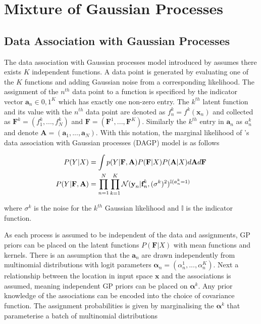 \documentclass[12pt,a4paper]{report}
\theoremstyle{definition}
\begin{document}
\section{Mixture of Gaussian Processes}

\subsection{Data Association with Gaussian Processes}

The data association with Gaussian processes model introduced by \citet{Kaiser2020} assumes there exists $K$ independent functions.
A data point is generated by evaluating one of the $K$ functions and adding Gaussian noise from a corresponding likelihood.
The assignment of the $n^{th}$ data point to a function is specificed by the indicator vector $\textbf{a}_{n} \in {0, 1}^K$ which has exactly one non-zero entry.
The $k^{th}$ latent function and its value with the $n^{th}$ data point are denoted as $f_{n}^k = f^k(\textbf{x}_{n})$ and collected as $\textbf{F}^k = (f_{1}^k, ... , f_{N}^k)$ and $\textbf{F} = (\textbf{F}^1, ... , \textbf{F}^K)$.
Similarly the $k^{th}$ entry in $\textbf{a}_{n}$ as $a_{n}^k$ and denote $\textbf{A} = (\textbf{a}_{1}, ... , \textbf{a}_{N})$.
With this notation, the marginal likelihood of \citeauthor{Kaiser2020}'s \citeyearpar{Kaiser2020} data association with Gaussian processes (DAGP) model is as follows

\begin{equation}
	\begin{aligned}
		\centering 
		P(Y | X) &= \int p(Y | \textbf{F}, \textbf{A}) P(\textbf{F} | X) P(\textbf{A} | X) d\textbf{A}d\textbf{F} \\
		P(Y | \textbf{F}, \textbf{A}) &= \prod_{n=1}^{N} \prod_{k=1}^{K} \mathcal{N}(\textbf{y}_{n} | \textbf{f}_{n}^k, (\sigma^k)^2)^{\mathbb{I}(a_{n}^k = 1)}
	\end{aligned}
\end{equation}

where $\sigma^k$ is the noise for the $k^{th}$ Gaussian likelihood and $\mathbb{I}$ is the indicator function.

As each process is assumed to be independent of the data and assignments, GP priors can be placed on the latent functions $P(\textbf{F} | X)$ with mean functions and kernels.
There is an assumption that the $\textbf{a}_{n}$ are drawn independently from multinomial distributions with logit parameters $\boldsymbol{\alpha}_{n} = (\alpha_{n}^1, ... , \alpha_{n}^K)$. 
Next a relationship between the location in input space $\textbf{x}$ and the associations is assumed, meaning independent GP priors can be placed on $\boldsymbol{\alpha}^k$.
Any prior knowledge of the associations can be encoded into the choice of covariance function.
The assignment probabilities is given by marginalising the $\boldsymbol{\alpha}^k$ that parameterise a batch of multinomial distributions
\end{document}
